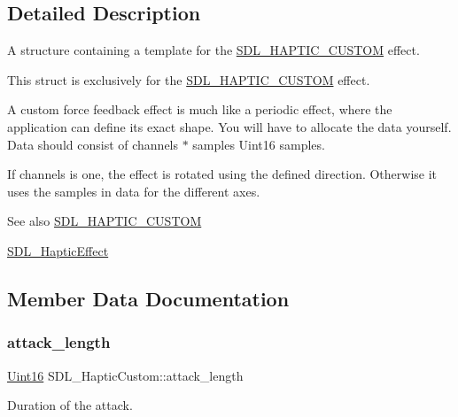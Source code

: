 \subsection{Detailed Description}
A structure containing a template for the \mbox{\hyperlink{_s_d_l__haptic_8h_a8a18c4de1076ac9bebd718329d16db29}{S\+D\+L\+\_\+\+H\+A\+P\+T\+I\+C\+\_\+\+C\+U\+S\+T\+OM}} effect. 

This struct is exclusively for the \mbox{\hyperlink{_s_d_l__haptic_8h_a8a18c4de1076ac9bebd718329d16db29}{S\+D\+L\+\_\+\+H\+A\+P\+T\+I\+C\+\_\+\+C\+U\+S\+T\+OM}} effect.

A custom force feedback effect is much like a periodic effect, where the application can define its exact shape. You will have to allocate the data yourself. Data should consist of channels $\ast$ samples Uint16 samples.

If channels is one, the effect is rotated using the defined direction. Otherwise it uses the samples in data for the different axes.

\begin{DoxySeeAlso}{See also}
\mbox{\hyperlink{_s_d_l__haptic_8h_a8a18c4de1076ac9bebd718329d16db29}{S\+D\+L\+\_\+\+H\+A\+P\+T\+I\+C\+\_\+\+C\+U\+S\+T\+OM}} 

\mbox{\hyperlink{union_s_d_l___haptic_effect}{S\+D\+L\+\_\+\+Haptic\+Effect}} 
\end{DoxySeeAlso}


\subsection{Member Data Documentation}
\mbox{\label{struct_s_d_l___haptic_custom_a018b35d89398c26e10d1fb4315d1dda1}} 
\subsubsection{\texorpdfstring{attack\+\_\+length}{attack\_length}}
{\footnotesize\ttfamily \mbox{\hyperlink{_s_d_l__stdinc_8h_a31fcc0a076c9068668173ee26d33e42b}{Uint16}} S\+D\+L\+\_\+\+Haptic\+Custom\+::attack\+\_\+length}

Duration of the attack. \mbox{\label{struct_s_d_l___haptic_custom_ad6e394e3775372af3eb9e02823987405}} 
